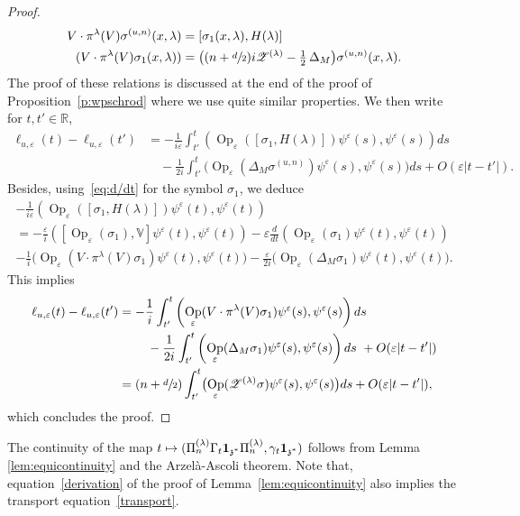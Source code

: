 \documentclass[JEP,XML,SOM,Unicode,published]{cedram}
\let\mathcal\mathscr
\newcommand\mto{\mathchoice{\longmapsto}{\mapsto}{\mapsto}{\mapsto}}
\newcommand{\bun}{\mathbf{1}}
\DeclareMathOperator{\Op}{Op}
\theoremstyle{plain}
\theoremstyle{definition}
\let\eps\varepsilon
\def\R{{\mathbb R}}
\def\bbV{{\mathbb V}}
\begin{document}
\begin{proof}
\begin{align}
V\cdot \pi^\lambda(V)\sigma^{(u,n)}(x,\lambda)&= [\sigma_1(x,\lambda), H(\lambda)] \label{e:offdiag5}\\
(V\cdot \pi^\lambda(V) \sigma_1(x,\lambda)) &= \bigl((n+\sfrac d2)	i {\mathcal Z}^{(\lambda)} - \tfrac 12\, \Delta_M\bigr) \sigma^{(u,n)}(x,\lambda).	\nonumber
\end{align}
The proof of these relations is discussed at the end of the proof of Proposition~\ref{p:wpschrod} where we use quite similar properties.
We then write for $t,t'\in\R$,
\begin{align*}
\ell_{u,\eps}(t)-\ell_{u,\eps}(t') &= -\frac 1 {i\eps} \int_{t'}^t
\left(\Op_\eps([ \sigma_1,H(\lambda)])\psi^\eps(s),\psi^\eps(s)\right)ds\\
&\quad -\frac 1{2i}
\int_{t'}^t
\bigl(\Op_\eps(\Delta_M \sigma^{(u,n)}) \psi^\eps(s),\psi^\eps(s)\bigr)ds +O(\eps |t-t'|).
\end{align*}
Besides, using~\eqref{eq:d/dt} for the symbol $\sigma_1$, we deduce
\begin{multline*}
-\frac 1{i\eps} \left(\Op_\eps([ \sigma_1,H(\lambda)])\psi^\eps(t),\psi^\eps(t)\right)\\
=-\frac \eps {i} \left([\Op_\eps(\sigma_1),\bbV] \psi^\eps(t),\psi^\eps(t)\right)
-\eps \frac d{dt} \left(\Op_\eps(\sigma_1) \psi^\eps(t),\psi^\eps(t)\right) \\
-\frac 1 i \bigl(\Op_\eps(V\cdot \pi^\lambda(V) \sigma_1) \psi^\eps(t),\psi^\eps(t)\bigr)-\frac \eps {2i} \bigl(\Op_\eps(\Delta_M \sigma_1) \psi^\eps(t),\psi^\eps(t)\bigr).
\end{multline*}
This implies
\begin{equation}
\label{derivation}
\begin{aligned}
\ell_{u,\eps}(t)-\ell_{u,\eps}(t')& = -\frac 1 i \int_{t'}^t \left(\Op_\eps(V\cdot \pi^\lambda(V) \sigma_1) \psi^\eps(s),\psi^\eps(s)\right) ds\\
&
\hspace*{.8cm}-\frac 1{2i}
\int_{t'}^t
\left(\Op_\eps(\Delta_M \sigma_1) \psi^\eps(s),\psi^\eps(s)\right)ds \ +O(\eps |t-t'|)\\
& = (n+\sfrac d 2) \int_{t'}^t \bigl(\Op_\eps(\mathcal Z^{(\lambda)} \sigma) \psi^\eps(s),\psi^\eps(s)\bigr) ds
+O(\eps |t-t'|),
\end{aligned}
\end{equation}
which concludes the proof.
\end{proof}
The continuity of the map $t\mto (\Pi_n^{(\lambda)}\Gamma_t \bun_{\mathfrak z^*}\Pi_n^{(\lambda)},\gamma_t \bun_{\mathfrak z^*})$ follows from Lemma \ref{lem:equicontinuity} and the Arzelà-Ascoli theorem. Note that, equation~\eqref{derivation} of the proof of Lemma~\ref{lem:equicontinuity} also implies the transport equation~\eqref{transport}.
\end{document}
